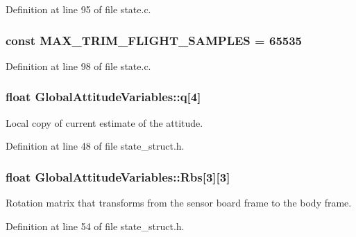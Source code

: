 Definition at line 95 of file state.\-c.

\hypertarget{group___state_ga6faaeb7ea10f4d232ea751bdcebb3aef}{
\subsubsection[{M\-A\-X\-\_\-\-T\-R\-I\-M\-\_\-\-F\-L\-I\-G\-H\-T\-\_\-\-S\-A\-M\-P\-L\-E\-S}]{ {\bf const} M\-A\-X\-\_\-\-T\-R\-I\-M\-\_\-\-F\-L\-I\-G\-H\-T\-\_\-\-S\-A\-M\-P\-L\-E\-S = 65535}}\label{group___state_ga6faaeb7ea10f4d232ea751bdcebb3aef}


Definition at line 98 of file state.\-c.

\hypertarget{group___state_ga34a6662a3aea49780925afa629a917cf}{
\subsubsection[{q}]{\setlength{\rightskip}{0pt plus 5cm}float Global\-Attitude\-Variables\-::q\mbox{[}4\mbox{]}}}\label{group___state_ga34a6662a3aea49780925afa629a917cf}


Local copy of current estimate of the attitude. 



Definition at line 48 of file state\-\_\-struct.\-h.

\hypertarget{group___state_ga6c34048525801ac0e7e26eb733c759d5}{
\subsubsection[{Rbs}]{\setlength{\rightskip}{0pt plus 5cm}float Global\-Attitude\-Variables\-::\-Rbs\mbox{[}3\mbox{]}\mbox{[}3\mbox{]}}}\label{group___state_ga6c34048525801ac0e7e26eb733c759d5}


Rotation matrix that transforms from the sensor board frame to the body frame. 



Definition at line 54 of file state\-\_\-struct.\-h.

